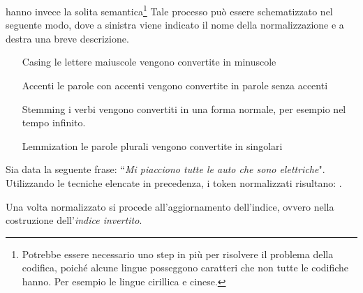 hanno invece la solita semantica\footnote{Potrebbe essere necessario uno step in più per risolvere il problema della codifica, poiché alcune lingue posseggono caratteri che non tutte le codifiche hanno. Per esempio le
lingue cirillica e cinese.}
Tale processo può essere schematizzato nel seguente modo, dove a sinistra viene indicato
il nome della normalizzazione e a destra una breve descrizione.
\begin{itemize}
	\item[Casing] le lettere maiuscole vengono convertite in minuscole
	\item[Accenti] le parole con accenti vengono convertite in parole senza accenti
	\item[Stemming] i verbi vengono convertiti in una forma normale, per esempio nel tempo infinito.
	\item[Lemmization] le parole plurali vengono convertite in singolari
\end{itemize}

\begin{esempio}[normalization]
	Sia data la seguente frase: ``\textit{Mi piacciono tutte le auto che sono elettriche}".
	Utilizzando le tecniche elencate in precedenza, i token normalizzati risultano:
	    
	  .
\end{esempio}

Una volta normalizzato si procede all'aggiornamento dell'indice, ovvero nella costruzione
dell'\textit{indice invertito}. 